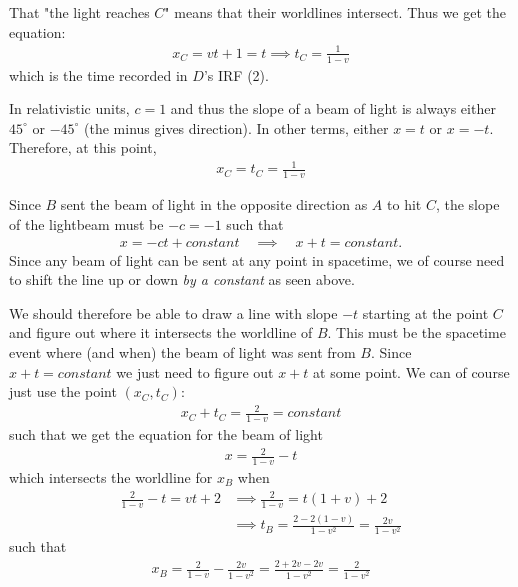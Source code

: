 \documentclass[a4paper]{article}
\begin{document}
   That "the light reaches \(C\)" means that their worldlines intersect. Thus we get the equation: \begin{align*}
    x_C = vt + 1 = t \implies t_C = \frac{1}{1 - v}
   \end{align*} 
   which is the time recorded in \(D\)'s IRF (2).

   In relativistic units, \(c = 1\) and thus the slope of a beam of light is always either \(45^\circ\) or \(- 45^\circ\) (the minus gives direction). In other terms, either \(x = t\) or \(x = -t\). Therefore, at this point, \begin{align*}
    x_C = t_C = \frac{1}{1 - v}
   \end{align*}
   
   Since \(B\) sent the beam of light in the opposite direction as \(A\) to hit \(C\), the slope of the lightbeam must be \(-c = -1\) such that \begin{align*}
    x = -ct + constant \quad \implies \quad x + t = constant.
   \end{align*}
   Since any beam of light can be sent at any point in spacetime, we of course need to shift the line up or down \textit{by a constant} as seen above.
   
   We should therefore be able to draw a line with slope \(-t\) starting at the point \(C\) and figure out where it intersects the worldline of \(B\). This must be the spacetime event where (and when) the beam of light was sent from \(B\). Since \(x + t = constant\) we just need to figure out \(x + t\) at some point. We can of course just use the point \((x_C, t_C)\): \begin{align*}
    x_C + t_C = \frac{2}{1 - v} = constant
   \end{align*}
   such that we get the equation for the beam of light \begin{align*}
    x = \frac{2}{1 - v} - t
   \end{align*} 
   which intersects the worldline for \(x_B\) when \begin{align*}
    \frac{2}{1 - v} - t = vt + 2 &\implies \frac{2}{1 - v} = t (1 + v) + 2\\
    &\implies t_B = \frac{2 - 2(1 - v)}{1 - v^{2}} = \frac{2v}{1 - v^{2}}
   \end{align*} 
   such that \begin{align*}
    x_B = \frac{2}{1 - v} - \frac{2v}{1 - v^{2}} = \frac{2 + 2v - 2v}{1 - v^{2} } = \frac{2}{1 - v^{2}}
   \end{align*}
   
\end{document}
